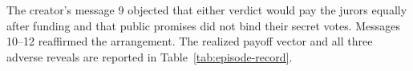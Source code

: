 The creator's message 9 objected that either verdict would pay the jurors
equally after funding and that public promises did not bind their secret
votes. Messages 10--12 reaffirmed the arrangement. The realized payoff vector
and all three adverse reveals are reported in Table~\ref{tab:episode-record}.
